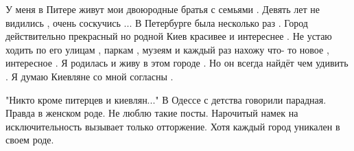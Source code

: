 \begin{itemize}

У меня в Питере живут мои двоюродные братья с семьями . Девять лет не видились
, очень соскучись ... В Петербурге была несколько раз . Город действительно
прекрасный но родной Киев красивее и интереснее . Не устаю ходить по его улицам
, паркам , музеям и каждый раз нахожу что- то новое , интересное . Я родилась и
живу в этом городе . Но он всегда найдёт чем удивить . Я думаю Киевляне со мной
согласны .


"Никто кроме питерцев и киевлян..." В Одессе с детства говорили парадная.
Правда в женском роде. Не люблю такие посты. Нарочитый намек на
исключительность вызывает только отторжение. Хотя каждый город уникален в своем
роде.

\end{itemize} %
